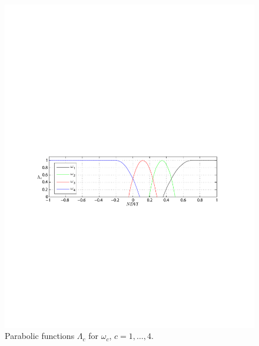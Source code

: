 \documentclass[letterpaper, 10pt, conference]{ieeeconf}      %
\begin{document}
\begin{figure}[t]
      \vspace{2mm}\centering
      \includegraphics[trim = 28mm 105.5mm 30mm 131mm, clip,width=0.99\linewidth]{../images/parabola_omega2.pdf}\vspace{-1mm}
      \caption{Parabolic functions $\Lambda_c$ for $\omega_c$, $c=1,\ldots, 4$.}
       \label{fig:parabola}
            \vspace{-3mm}
   \end{figure}
   


\end{document}
